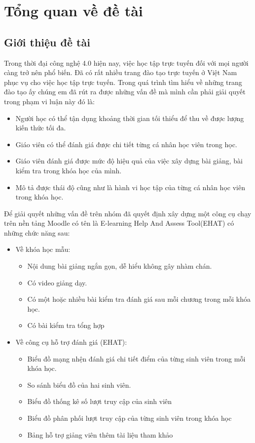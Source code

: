 \setcounter{chapter}{0}
\fontsize{13}{5}\selectfont
\chapter{Tổng quan về đề tài}
\section{Giới thiệu đề tài}
Trong thời đại công nghệ 4.0 hiện nay, việc học tập trực tuyến đối với mọi người càng trở nên phổ biến. Đã có rất nhiều trang đào tạo trực tuyến ở Việt Nam phục vụ cho việc học tập trực tuyến. Trong quá trình tìm hiểu về những trang đào tạo ấy chúng em đã rút ra được những vấn đề mà mình cần phải giải quyết trong phạm vi luận này đó là:

\begin{itemize}
	\item Người học có thể tận dụng khoảng thời gian tối thiểu để thu về được lượng kiến thức tối đa.
	\item Giáo viên có thể đánh giá được chi tiết từng cá nhân học viên trong học.
	\item Giáo viên đánh giá được mức độ hiệu quả của việc xây dựng bài giảng, bài kiểm tra trong khóa học của mình.
	\item Mô tả được thái độ cũng như là hành vi học tập của từng cá nhân học viên trong khóa học.
\end{itemize}

Để giải quyết những vấn đề trên nhóm đã quyết định xây dựng một công cụ chạy trên nền tảng Moodle có tên là E-learning Help And Assess Tool(EHAT) có những chức năng sau:

\begin{itemize}
	\item Về khóa học mẫu:
	\begin{itemize}
		\item Nội dung bài giảng ngắn gọn, dễ hiểu không gây nhàm chán.
		\item Có video giảng dạy.
		\item Có một hoặc nhiều bài kiểm tra đánh giá sau mỗi chương trong mỗi khóa học.
		\item Có bài kiểm tra tổng hợp
	\end{itemize}
	\item Về công cụ hỗ trợ đánh giá (EHAT):
	\begin{itemize}
		\item Biểu đồ mạng nhện đánh giá chi tiết điểm của từng sinh viên trong mỗi khóa học.
		\item So sánh biểu đồ của hai sinh viên.
		\item Biểu đồ thống kê số lượt truy cập của sinh viên
		\item Biểu đồ phân phối lượt truy cập của từng sinh viên trong khóa học
		\item Bảng hỗ trợ giảng viên thêm tài liệu tham khảo
	\end{itemize}
\end{itemize}

